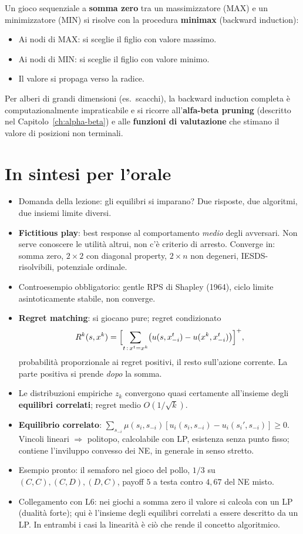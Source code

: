 \documentclass[12pt,a4paper,twoside]{book}
\theoremstyle{plain}
\theoremstyle{definition}
\begin{document}
Un gioco sequenziale a \textbf{somma zero} tra un massimizzatore (MAX) e un
minimizzatore (MIN) si risolve con la procedura \textbf{minimax} (backward induction):
\begin{itemize}
  \item Ai nodi di MAX: si sceglie il figlio con valore massimo.
  \item Ai nodi di MIN: si sceglie il figlio con valore minimo.
  \item Il valore si propaga verso la radice.
\end{itemize}
Per alberi di grandi dimensioni (es.\ scacchi), la backward induction completa è
computazionalmente impraticabile e si ricorre all'\textbf{alfa-beta pruning}
(descritto nel Capitolo~\ref{ch:alpha-beta}) e alle \textbf{funzioni di valutazione}
che stimano il valore di posizioni non terminali.

\section*{In sintesi per l'orale}
\begin{itemize}
  \item Domanda della lezione: gli equilibri si imparano? Due risposte, due
        algoritmi, due insiemi limite diversi.
  \item \textbf{Fictitious play}: best response al comportamento \emph{medio} degli
        avversari. Non serve conoscere le utilità altrui, non c'è criterio di
        arresto. Converge in: somma zero, $2\times2$ con diagonal property,
        $2\times n$ non degeneri, IESDS-risolvibili, potenziale ordinale.
  \item Controesempio obbligatorio: gentle RPS di Shapley (1964), ciclo limite
        asintoticamente stabile, non converge.
  \item \textbf{Regret matching}: si giocano pure; regret condizionato
        \[
          R^k(s,x^k)=\Bigl[\sum_{t\,:\,x^t=x^k}\bigl(u(s,x^t_{-i})-u(x^k,x^t_{-i})\bigr)\Bigr]^{+},
        \]
        probabilità proporzionale ai regret positivi, il resto sull'azione
        corrente. La parte positiva si prende \emph{dopo} la somma.
  \item Le distribuzioni empiriche $z_k$ convergono quasi certamente all'insieme
        degli \textbf{equilibri correlati}; regret medio $O(1/\sqrt{k})$.
  \item \textbf{Equilibrio correlato}: $\sum_{s_{-i}}\mu(s_i,s_{-i})[u_i(s_i,s_{-i})
        -u_i(s_i',s_{-i})]\ge 0$. Vincoli lineari $\Rightarrow$ politopo,
        calcolabile con LP, esistenza senza punto fisso; contiene l'inviluppo
        convesso dei NE, in generale in senso stretto.
  \item Esempio pronto: il semaforo nel gioco del pollo, $1/3$ su
        $(C,C),(C,D),(D,C)$, payoff $5$ a testa contro $4{,}67$ del NE misto.
  \item Collegamento con L6: nei giochi a somma zero il valore si calcola con un LP
        (dualità forte); qui è l'insieme degli equilibri correlati a essere
        descritto da un LP. In entrambi i casi la linearità è ciò che rende il
        concetto algoritmico.
\end{itemize}
\end{document}

